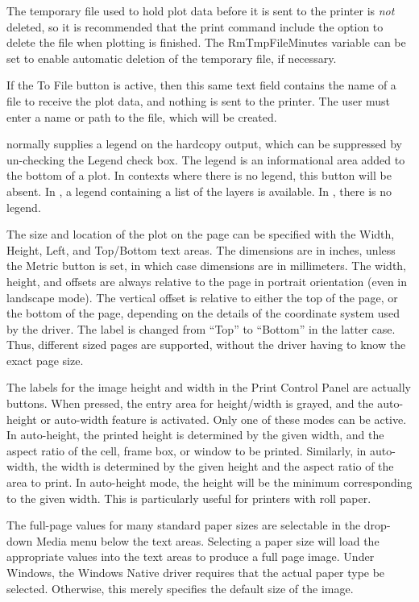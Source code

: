 The temporary file used to hold plot data before it is sent to the
printer is {\it not\/} deleted, so it is recommended that the print
command include the option to delete the file when plotting is
finished.  The {\et RmTmpFileMinutes} variable can be set to enable
automatic deletion of the temporary file, if necessary.

If the {\cb To File} button is active, then this same text field
contains the name of a file to receive the plot data, and nothing is
sent to the printer.  The user must enter a name or path to the file,
which will be created.

{\Xic} normally supplies a legend on the hardcopy output, which can be
suppressed by un-checking the {\cb Legend} check box.  The legend is
an informational area added to the bottom of a plot.  In contexts
where there is no legend, this button will be absent.  In {\Xic}, a
legend containing a list of the layers is available.  In {\WRspice},
there is no legend.

The size and location of the plot on the page can be specified with
the {\cb Width}, {\cb Height}, {\cb Left}, and {\cb Top}/{\cb Bottom}
text areas.  The dimensions are in inches, unless the {\cb Metric}
button is set, in which case dimensions are in millimeters.  The
width, height, and offsets are always relative to the page in portrait
orientation (even in landscape mode).  The vertical offset is relative
to either the top of the page, or the bottom of the page, depending on
the details of the coordinate system used by the driver.  The label is
changed from ``{\vt Top}'' to ``{\vt Bottom}'' in the latter case. 
Thus, different sized pages are supported, without the driver having
to know the exact page size. 

The labels for the image height and width in the {\cb Print Control
Panel} are actually buttons.  When pressed, the entry area for
height/width is grayed, and the auto-height or auto-width feature is
activated.  Only one of these modes can be active.  In auto-height,
the printed height is determined by the given width, and the aspect
ratio of the cell, frame box, or window to be printed.  Similarly, in
auto-width, the width is determined by the given height and the aspect
ratio of the area to print.  In auto-height mode, the height will be
the minimum corresponding to the given width.  This is particularly
useful for printers with roll paper.

The full-page values for many standard paper sizes are selectable in
the drop-down {\cb Media} menu below the text areas.  Selecting a
paper size will load the appropriate values into the text areas to
produce a full page image.  Under Windows, the {\et Windows Native}
driver requires that the actual paper type be selected.  Otherwise,
this merely specifies the default size of the image.

